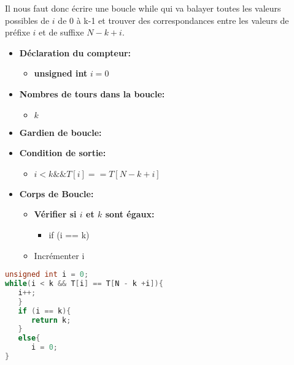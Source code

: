 \vspace{0.4cm}
Il nous faut donc écrire une boucle while qui va balayer toutes les valeurs
possibles de $i$ de 0 à k-1 et trouver des correspondances entre les
valeurs de préfixe $i$ et de suffixe $N-k+i$.
\begin{itemize}
   \item \textbf{Déclaration du compteur:}
      \begin{itemize}
         \item \textbf{unsigned int} $i = 0$
      \end{itemize}
   \item \textbf{Nombres de tours dans la boucle:}
      \begin{itemize}
         \item $k$
      \end{itemize}
   \item \textbf{Gardien de boucle:}
   \item \textbf{Condition de sortie:}
      \begin{itemize}
         \item $i < k $\space$ \&\& $\space$ T[i] == T[N - k +i]$
      \end{itemize}
   \item \textbf{Corps de Boucle:}
   \begin{itemize}
      \item \textbf{Vérifier si $i$ et $k$ sont égaux:}
      \begin{itemize}
      \item if (i == k)
      \end{itemize}
      \item Incrémenter i
   \end{itemize}
\end{itemize}

\vspace{0.4cm}
\begin{lstlisting}[language=C, caption=SP2]
unsigned int i = 0;
while(i < k && T[i] == T[N - k +i]){
   i++;
   }
   if (i == k){
      return k;
   }
   else{
      i = 0;
}
\end{lstlisting}